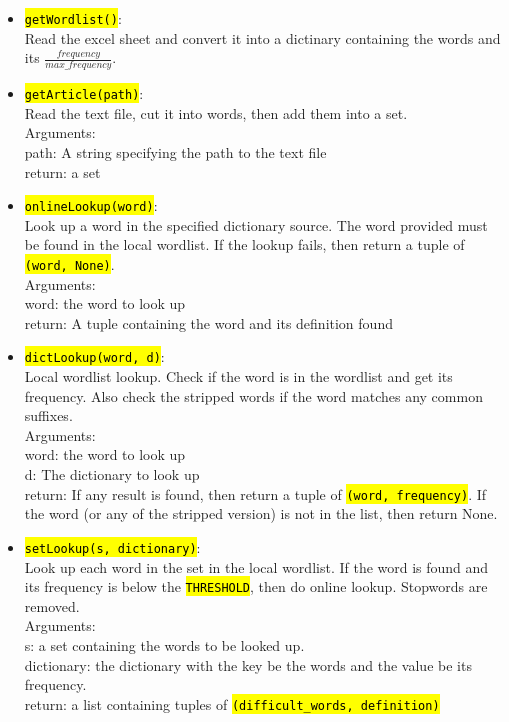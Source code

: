 \documentclass[12pt]{article}
\newcommand{\hltexttt}[1]{\texttt{\hl{#1}}}
\begin{document}
\begin{itemize}
	\item \hltexttt{getWordlist()}:\\
		Read the excel sheet and convert it into a dictinary containing the words and its $\frac{frequency}{max\_frequency}$. 
	\item \hltexttt{getArticle(path)}:\\
		Read the text file, cut it into words, then add them into a set.\\
		Arguments:\\
		path: A string specifying the path to the text file\\
		return: a set
	\item \hltexttt{onlineLookup(word)}:\\
		Look up a word in the specified dictionary source. The word provided must be found in the local wordlist. If the lookup fails, then return a tuple of \hltexttt{(word, None)}.\\
		Arguments: \\
		word: the word to look up\\
		return: A tuple containing the word and its definition found\\
	\item \hltexttt{dictLookup(word, d)}:\\
		Local wordlist lookup. Check if the word is in the wordlist and get its frequency. Also check the stripped words if the word matches any common suffixes.\\
		Arguments:\\
		word: the word to look up\\
		d: The dictionary to look up\\
		return: If any result is found, then return a tuple of \hltexttt{(word, frequency)}. If the word (or any of the stripped version) is not in the list, then return None.
	
	\item \hltexttt{setLookup(s, dictionary)}:\\
		Look up each word in the set in the local wordlist. If the word is found and its frequency is below the \hltexttt{THRESHOLD}, then do online lookup. Stopwords are removed.\\
		Arguments:\\
		s: a set containing the words to be looked up.\\
		dictionary: the dictionary with the key be the words and the value be its frequency.\\
		return: a list containing tuples of \hltexttt{(difficult\_words, definition)}
		 
\end{itemize}
\end{document}
